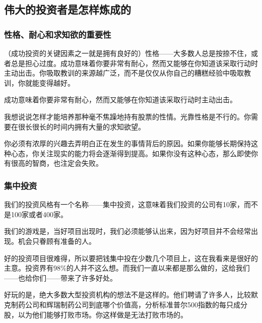 \subsection*{伟大的投资者是怎样炼成的}

\subsubsection*{性格、耐心和求知欲的重要性}

（成功投资的关键因素之一就是拥有良好的）性格——大多数人总是按捺不住，或者总是担心过度。成功意味着你要非常有耐心，然而又能够在你知道该采取行动时主动出击。你吸取教训的来源越广泛，而不是仅仅从你自己的糟糕经验中吸取教训，你就能变得越好。
\par

\begin{WisdomBox}
\par

成功意味着你要非常有耐心，然而又能够在你知道该采取行动时主动出击。
\par
\end{WisdomBox}

我想说说怎样才能培养那种毫不焦躁地持有股票的性情。光靠性格是不行的。你需要在很长很长的时间内拥有大量的求知欲望。
\par

你必须有浓厚的兴趣去弄明白正在发生的事情背后的原因。如果你能够长期保持这种心态，你关注现实的能力将会逐渐得到提高。如果你没有这种心态，那么即使你有很高的智商，也注定会失败。
\par

\subsubsection*{集中投资}

我们的投资风格有一个名称——集中投资，这意味着我们投资的公司有10家，而不是100家或者400家。
\par

我们的游戏是，当好项目出现时，我们必须能够认出来，因为好项目并不会经常出现。机会只眷顾有准备的人。
\par

好的投资项目很难得，所以要把钱集中投在少数几个项目上，这在我看来是很好的主意。投资界有98\%的人并不这么想。而我们一直以来都是那么做的，这给我们——也给你们——带来了许多好处。
\par

好玩的是，绝大多数大型投资机构的想法不是这样的。他们聘请了许多人，比较默克制药公司和辉瑞制药公司到底哪个价值高，分析标准普尔500指数的每只成分股，以为他们能够打败市场。你这样做是无法打败市场的。
\par

